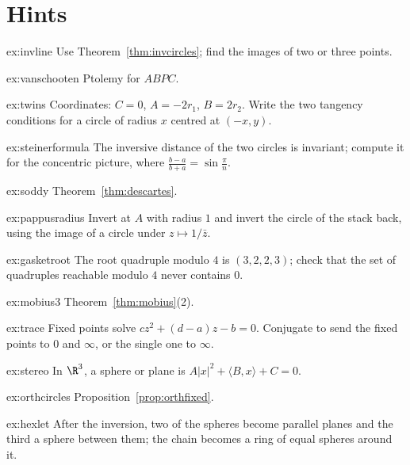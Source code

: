 \section{Hints}

\begin{hint}{ex:invline}
Use Theorem~\ref{thm:invcircles}; find the images of two or three points.
\end{hint}
\begin{hint}{ex:vanschooten}
Ptolemy for $ABPC$.
\end{hint}
\begin{hint}{ex:twins}
Coordinates: $C=0$, $A=-2r_1$, $B=2r_2$. Write the two tangency conditions for a circle of radius $x$ centred at $(-x,y)$.
\end{hint}
\begin{hint}{ex:steinerformula}
The inversive distance of the two circles is invariant; compute it for the concentric picture, where $\frac{b-a}{b+a}=\sin\frac\pi n$.
\end{hint}
\begin{hint}{ex:soddy}
Theorem~\ref{thm:descartes}.
\end{hint}
\begin{hint}{ex:pappusradius}
Invert at $A$ with radius $1$ and invert the circle of the stack back, using the image of a circle under $z\mapsto1/\bar z$.
\end{hint}
\begin{hint}{ex:gasketroot}
The root quadruple modulo $4$ is $(3,2,2,3)$; check that the set of quadruples reachable modulo $4$ never contains $0$.
\end{hint}
\begin{hint}{ex:mobius3}
Theorem~\ref{thm:mobius}(2).
\end{hint}
\begin{hint}{ex:trace}
Fixed points solve $cz^2+(d-a)z-b=0$. Conjugate to send the fixed points to $0$ and $\infty$, or the single one to $\infty$.
\end{hint}
\begin{hint}{ex:stereo}
In $\R^3$, a sphere or plane is $A|x|^2+\langle B,x\rangle+C=0$.
\end{hint}
\begin{hint}{ex:orthcircles}
Proposition~\ref{prop:orthfixed}.
\end{hint}
\begin{hint}{ex:hexlet}
After the inversion, two of the spheres become parallel planes and the third a sphere between them; the chain becomes a ring of equal spheres
around it.
\end{hint}

